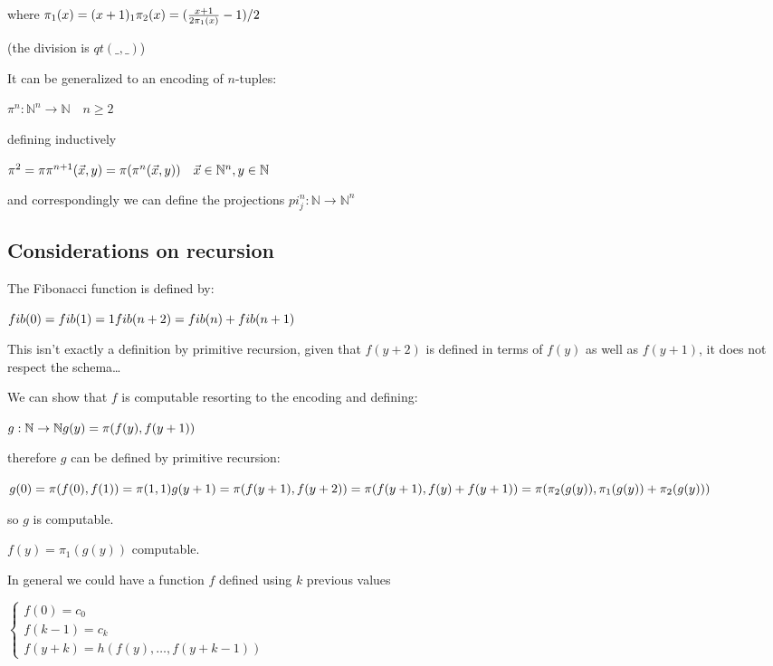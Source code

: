 \documentclass{amsbook}
\newcommand{\nat}{\ensuremath{\mathbb{N}}}
\theoremstyle{definition}
\theoremstyle{remark}
\numberwithin{section}{chapter}
\numberwithin{equation}{chapter}
\begin{document}
where $\pi_1(x) = (x+1)_1\\
	\pi_2(x) = (\frac{x+1}{2\pi_1(x)}-1)/2$

(the division is $qt(\_,\_)$)

It can be generalized to an encoding of $n$-tuples:

$\pi^n: \nat^n\rightarrow\nat \quad n\geq2$

defining inductively

$\pi^2 = \pi\\
	\\
	\pi^{n+1}(\vec{x},y) = \pi(\pi^n(\vec{x},y)) \quad \vec{x} \in \nat^n, y \in \nat$

and correspondingly we can define the projections $pi_j^n:\nat\rightarrow\nat^n$

\subsection{Considerations on recursion}

The Fibonacci function is defined by:

$ fib(0) = fib(1) = 1\\
	\\
	fib(n+2) = fib(n) + fib(n+1) $

This isn't exactly a definition by primitive recursion, given that $f(y+2)$ is defined in terms of $f(y)$ as well as $f(y+1)$, it does not respect the schema\dots

We can show that $f$ is computable resorting to the encoding and defining:

$g:\nat\rightarrow\nat\\
	g(y) = \pi(f(y),f(y+1))$

therefore $g$ can be defined by primitive recursion:

$g(0) = \pi(f(0),f(1)) = \pi(1,1)\\
	g(y+1) = \pi(f(y+1),f(y+2)) = \pi(f(y+1),f(y)+f(y+1))\\
	= \pi(\pi_2(g(y)), \pi_1(g(y)) + \pi_2(g(y)))$

so $g$ is computable.

$f(y) = \pi_1(g(y))$ computable.

In general we could have a function $f$ defined using $k$ previous values

$\begin{cases}
		f(0) = c_0   \\
		f(k-1) = c_k \\
		f(y+k) = h(f(y),\dots,f(y+k-1))
	\end{cases}$
\end{document}

